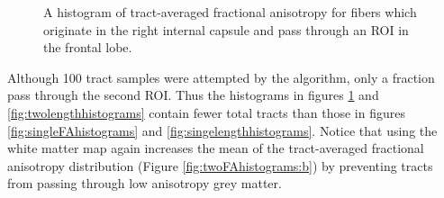 \begin{figure} \label{fig:twoFAhistograms}
	\caption{A histogram of tract-averaged fractional anisotropy for fibers which originate in the right internal capsule and pass through an ROI in the frontal lobe.}
\end{figure}

Although 100 tract samples were attempted by the algorithm, only a fraction pass through the second ROI.  Thus the histograms in figures \ref{fig:twoFAhistograms} and \ref{fig:twolengthhistograms} contain fewer total tracts than those in figures \ref{fig:singleFAhistograms} and \ref{fig:singelengthhistograms}.  Notice that using the white matter map again increases the mean of the tract-averaged fractional anisotropy distribution (Figure \ref{fig:twoFAhistograms:b}) by preventing tracts from passing through low anisotropy grey matter.

